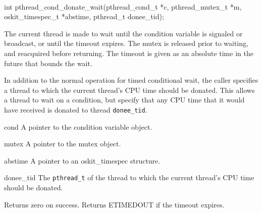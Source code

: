 \begin{apisyn}
	\\

	\funcproto int pthread_cond_donate_wait(pthread_cond_t *c,
		pthread_mutex_t *m, oskit_timespec_t *abstime,
		pthread_t donee_tid);
\end{apisyn}
\begin{apidesc}
	The current thread is made to wait until the condition variable is
	signaled or broadcast, or until the timeout expires. The mutex is
	released prior to waiting, and reacquired before returning. The
	timeout is given as an absolute time in the future that bounds the
	wait.

	In addition to the normal operation for timed conditional wait, the
	caller specifies a thread to which the current thread's CPU time
	should be donated. This allows a thread to wait on a condition, but
	specify that any CPU time that it would have received is donated to
	thread \texttt{donee_tid}.
\end{apidesc}
\begin{apiparm}
	\item[cond]
		A pointer to the condition variable object.
	\item[mutex]
		A pointer to the mutex object.
	\item[abstime]
		A pointer to an oskit_timespec structure.
	\item[donee_tid]
		The \texttt{pthread_t} of the thread to which the current
		thread's CPU time should be donated. 
\end{apiparm}
\begin{apiret}
	Returns zero on success. Returns ETIMEDOUT if the timeout expires.
\end{apiret}


